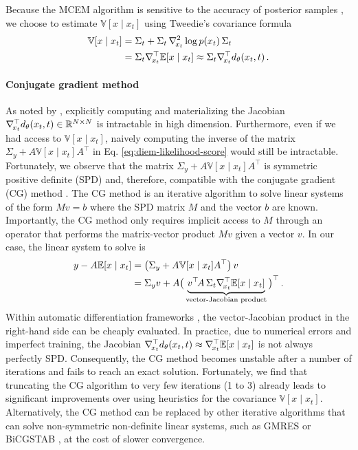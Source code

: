 Because the MCEM algorithm is sensitive to the accuracy of posterior samples \cite{levine2001implementations, caffo2005ascentbased, jank2006em, ruth2024review}, we choose to estimate $\mathbb{V}[x \mid x_t]$ using Tweedie's covariance formula \cite{tweedie1947functions, efron2011tweedies, kim2021noise2score, meng2021estimating}
\begin{align}
    \mathbb{V}[x \mid x_t] & = \Sigma_t + \Sigma_t \, \nabla_{\!{x_t}}^2 \log p(x_t) \, \Sigma_t \\
    & = \Sigma_t \nabla_{\!{x_t}}^\top \mathbb{E}[x \mid x_t] \approx \Sigma_t \nabla_{\!{x_t}}^\top d_\theta(x_t, t) \, .
\end{align}

\paragraph{Conjugate gradient method} As noted by \textcite{finzi2023userdefined}, explicitly computing and materializing the Jacobian $\nabla_{\!{x_t}}^\top d_\theta(x_t, t) \in \mathbb{R}^{N \times N}$ is intractable in high dimension. Furthermore, even if we had access to $\mathbb{V}[x \mid x_t]$, naively computing the inverse of the matrix $\Sigma_y + A \mathbb{V}[x \mid x_t] A^\top$ in Eq. \eqref{eq:diem-likelihood-score} would still be intractable. Fortunately, we observe that the matrix $\Sigma_y + A \mathbb{V}[x \mid x_t] A^\top$ is symmetric positive definite (SPD) and, therefore, compatible with the conjugate gradient (CG) method \cite{hestenes1952methods}. The CG method is an iterative algorithm to solve linear systems of the form $Mv = b$ where the SPD matrix $M$ and the vector $b$ are known. Importantly, the CG method only requires implicit access to $M$ through an operator that performs the matrix-vector product $Mv$ given a vector $v$. In our case, the linear system to solve is
\begin{align}
    y - A \mathbb{E}[x \mid x_t] & = \big(\Sigma_y + A \mathbb{V}[x \mid x_t] A^\top\big) \, v \\
    & = \Sigma_y v + A \big( \underbrace{v^\top \! A \, \Sigma_t \nabla_{\!{x_t}}^\top \mathbb{E}[x \mid x_t]}_{\text{vector-Jacobian product}} \big)^\top \, .
\end{align}
Within automatic differentiation frameworks \cite{bradbury2018jax, paszke2019pytorch}, the vector-Jacobian product in the right-hand side can be cheaply evaluated. In practice, due to numerical errors and imperfect training, the Jacobian $\nabla_{\!{x_t}}^\top d_\theta(x_t, t) \approx \nabla_{\!{x_t}}^\top \mathbb{E}[x \mid x_t]$ is not always perfectly SPD. Consequently, the CG method becomes unstable after a number of iterations and fails to reach an exact solution. Fortunately, we find that truncating the CG algorithm to very few iterations (1 to 3) already leads to significant improvements over using heuristics for the covariance $\mathbb{V}[x \mid x_t]$. Alternatively, the CG method can be replaced by other iterative algorithms that can solve non-symmetric non-definite linear systems, such as GMRES \cite{saad1986gmres} or BiCGSTAB \cite{vandervorst1992bicgstab}, at the cost of slower convergence.

